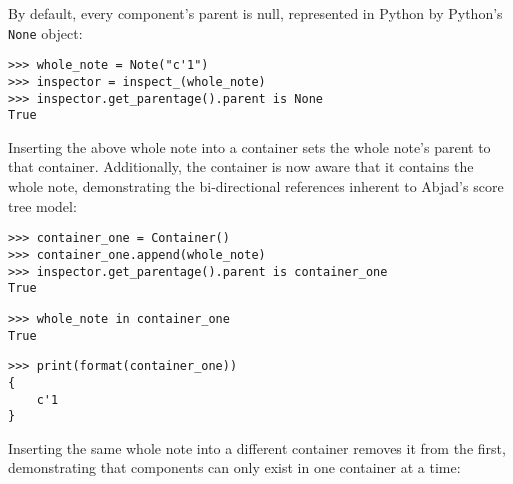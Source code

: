 \noindent By default, every component's parent is null, represented in Python
by Python's \texttt{None} object:

\begin{comment}
<abjad>
whole_note = Note("c'1")
inspector = inspect_(whole_note)
inspector.get_parentage().parent is None
</abjad>
\end{comment}

\begin{abjadbookoutput}
\begin{singlespacing}
\vspace{-0.5\baselineskip}
\begin{lstlisting}
>>> whole_note = Note("c'1")
>>> inspector = inspect_(whole_note)
>>> inspector.get_parentage().parent is None
True
\end{lstlisting}
\end{singlespacing}
\end{abjadbookoutput}

\noindent Inserting the above whole note into a container sets the whole note's
parent to that container. Additionally, the container is now aware that it
contains the whole note, demonstrating the bi-directional references inherent
to Abjad's score tree model:

\begin{comment}
<abjad>
container_one = Container()
container_one.append(whole_note)
inspector.get_parentage().parent is container_one
whole_note in container_one
print(format(container_one))
</abjad>
\end{comment}

\begin{abjadbookoutput}
\begin{singlespacing}
\vspace{-0.5\baselineskip}
\begin{lstlisting}
>>> container_one = Container()
>>> container_one.append(whole_note)
>>> inspector.get_parentage().parent is container_one
True
\end{lstlisting}
\begin{lstlisting}
>>> whole_note in container_one
True
\end{lstlisting}
\begin{lstlisting}
>>> print(format(container_one))
{
    c'1
}
\end{lstlisting}
\end{singlespacing}
\end{abjadbookoutput}

\noindent Inserting the same whole note into a different container removes it
from the first, demonstrating that components can only exist in one container
at a time:

